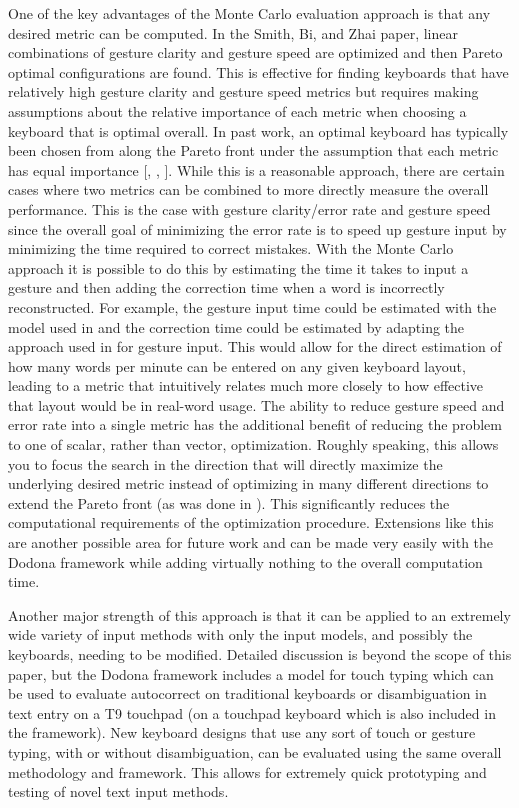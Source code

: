 \documentclass[final,1p,times,authoryear]{elsarticle}
\begin{document}
One of the key advantages of the Monte Carlo evaluation approach is that any desired metric can be computed.
In the Smith, Bi, and Zhai paper, linear combinations of gesture clarity and gesture speed are optimized and then Pareto optimal configurations are found.
This is effective for finding keyboards that have relatively high gesture clarity and gesture speed metrics but requires making assumptions about the relative importance of each metric when choosing a keyboard that is optimal overall.
In past work, an optimal keyboard has typically been chosen from along the Pareto front under the assumption that each metric has equal importance [\cite{Dunlop:2012:MPO:2207676.2208659}, \cite{Xiaojun:Complete}, \cite{googleKeyboard}].
While this is a reasonable approach, there are certain cases where two metrics can be combined to more directly measure the overall performance.
This is the case with gesture clarity/error rate and gesture speed since the overall goal of minimizing the error rate is to speed up gesture input by minimizing the time required to correct mistakes.
With the Monte Carlo approach it is possible to do this by estimating the time it takes to input a gesture and then adding the correction time when a word is incorrectly reconstructed.
For example, the gesture input time could be estimated with the model used in \cite{googleKeyboard} and the correction time could be estimated by adapting the approach used in \cite{Arif} for gesture input.
This would allow for the direct estimation of how many words per minute can be entered on any given keyboard layout, leading to a metric that intuitively relates much more closely to how effective that layout would be in real-word usage.
The ability to reduce gesture speed and error rate into a single metric has the additional benefit of reducing the problem to one of scalar, rather than vector, optimization.
Roughly speaking, this allows you to focus the search in the direction that will directly maximize the underlying desired metric instead of optimizing in many different directions to extend the Pareto front (as was done in \cite{googleKeyboard}).
This significantly reduces the computational requirements of the optimization procedure.
Extensions like this are another possible area for future work and can be made very easily with the Dodona framework while adding virtually nothing to the overall computation time.

Another major strength of this approach is that it can be applied to an extremely wide variety of input methods with only the input models, and possibly the keyboards, needing to be modified.
Detailed discussion is beyond the scope of this paper, but the Dodona framework includes a model for touch typing which can be used to evaluate autocorrect on traditional keyboards or disambiguation in text entry on a T9 touchpad (on a touchpad keyboard which is also included in the framework).
New keyboard designs that use any sort of touch or gesture typing, with or without disambiguation, can be evaluated using the same overall methodology and framework.
This allows for extremely quick prototyping and testing of novel text input methods.
\end{document}
